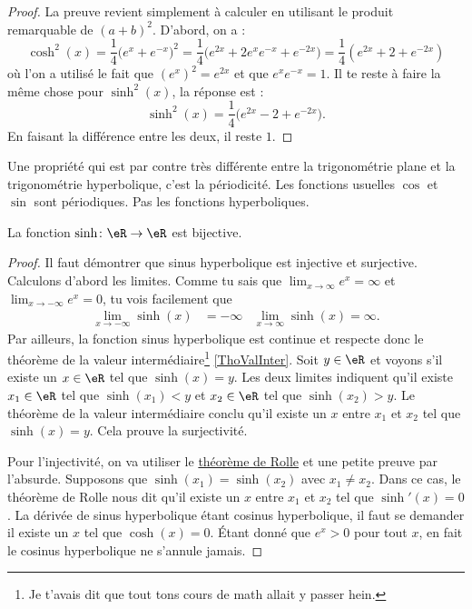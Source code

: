 \begin{proof}
La preuve revient simplement à calculer en utilisant le produit remarquable de $(a+b)^2$. D'abord, on a :
\[ 
  \cosh^2(x)=\frac{1}{ 4 }\big(  e^{x}+ e^{-x} \big)^2=\frac{1}{ 4 }\big(  e^{2x}+2 e^{x} e^{-x}+ e^{-2x} \big)=\frac{1}{ 4 }( e^{2x}+2+ e^{-2x})
\]
où l'on a utilisé le fait que $(e^{x})^2= e^{2x}$ et que $ e^{x} e^{-x}=1$. Il te reste à faire la même chose pour $\sinh^2(x)$, la réponse est :
\[ 
  \sinh^2(x)=\frac{1}{ 4 }\big(  e^{2x}-2+ e^{-2x} \big).
\]
En faisant la différence entre les deux, il reste $1$.
\end{proof}
Une propriété qui est par contre très différente entre la trigonométrie plane et la trigonométrie hyperbolique, c'est la périodicité. Les fonctions usuelles $\cos$ et $\sin$ sont périodiques. Pas les fonctions hyperboliques.

\begin{proposition}
La fonction $\sinh\colon \eR\to\eR $ est bijective.
\end{proposition}

\begin{proof}
Il faut démontrer que sinus hyperbolique est injective et surjective. Calculons d'abord les limites. Comme tu sais que $\lim_{x\to\infty} e^{x}=\infty$ et $\lim_{x\to-\infty} e^{x}=0$, tu vois facilement que
\begin{align}
\lim_{x\to-\infty}\sinh(x)&=-\infty	&\lim_{x\to\infty}\sinh(x)=\infty.
\end{align}
Par ailleurs, la fonction sinus hyperbolique est continue et respecte donc le théorème de la valeur intermédiaire\footnote{Je t'avais dit que tout tons cours de math allait y passer hein.} \ref{ThoValInter}. Soit $y\in\eR$ et voyons s'il existe un $x\in\eR$ tel que $\sinh(x)=y$. Les deux limites indiquent qu'il existe $x_1\in\eR$ tel que $\sinh(x_1)<y$ et $x_2\in\eR$ tel que $\sinh(x_2)>y$. Le théorème de la valeur intermédiaire conclu qu'il existe un $x$ entre $x_1$ et $x_2$ tel que $\sinh(x)=y$. Cela prouve la surjectivité.

Pour l'injectivité, on va utiliser le \href{http://fr.wikipedia.org/wiki/Théorème_de_Rolle}{théorème de Rolle} et une petite preuve par l'absurde. Supposons que $\sinh(x_1)=\sinh(x_2)$ avec $x_1\neq x_2$. Dans ce cas, le théorème de Rolle nous dit qu'il existe un $x$ entre $x_1$ et $x_2$ tel que $\sinh'(x)=0$. La dérivée de sinus hyperbolique étant cosinus hyperbolique, il faut se demander il existe un $x$ tel que $\cosh(x)=0$. Étant donné que $ e^{x}>0$ pour tout $x$, en fait le cosinus hyperbolique ne s'annule jamais.
\end{proof}


